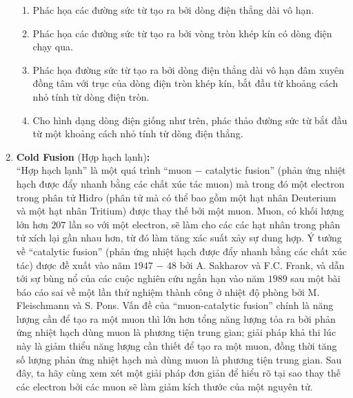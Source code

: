 \begin{vd}
\begin{enumerate}[{Phần }A.]
\begin{center}
\end{center}
 \begin{enumerate}[1)]
     \item Phác họa các đường sức từ tạo ra bởi dòng điện thẳng dài vô hạn.
     \item Phác họa các đường sức từ tạo ra bởi vòng tròn khép kín có dòng điện chạy qua.
     \item Phác họa đường sức từ tạo ra bởi dòng điện thẳng dài vô hạn đâm xuyên đồng tâm với trục của dòng điện tròn khép kín, bắt đầu từ khoảng cách nhỏ tính từ dòng điện tròn.
     \item Cho hình dạng dòng điện giống như trên, phác thảo đường sức từ bắt đầu từ một khoảng cách nhỏ tính từ dòng điện thẳng.
 \end{enumerate}   
    \item \textbf{Cold Fusion} (Hợp hạch lạnh)\textbf{:}\\
``Hợp hạch lạnh'' là một quá trình ``muon $-$ catalytic fusion'' (phản ứng nhiệt hạch được đẩy nhanh bằng các chất xúc tác muon) mà trong đó một electron trong phân tử Hidro (phân tử mà có thể bao gồm một hạt nhân Deuterium và một hạt nhân Tritium) được thay thế bởi một muon. Muon, có khối lượng lớn hơn $207$ lần so với một electron, sẽ làm cho các  các hạt nhân trong phân tử xích lại gần nhau hơn, từ đó làm tăng xác suất xảy sự dung hợp. Ý tưởng về ``catalytic fusion'' (phản ứng nhiệt hạch được đẩy nhanh bằng các chất xúc tác) được đề xuất vào năm $1947$ $-$ $48$ bởi  A. Sakharov và F.C. Frank, và dẫn tới sự bùng nổ của các cuộc nghiên cứu ngắn hạn vào năm $1989$ sau một bài báo cáo sai về một lần thử nghiệm thành công ở nhiệt độ phòng bởi M. Fleischmann và S. Pons. Vấn đề của ``muon-catalytic fusion'' chính là năng lượng cần để tạo ra một muon thì lớn hơn tổng năng lượng tỏa ra bởi phản ứng nhiệt hạch dùng muon là phương tiện trung gian; giải pháp khả thi lúc này là giảm thiểu năng lượng cần thiết để tạo ra một muon, đồng thời tăng số lượng phản ứng nhiệt hạch mà dùng muon là phương tiện trung gian. Sau đây, ta hãy cùng xem xét một giải pháp đơn giản để hiểu rõ tại sao thay thế các electron bởi các muon sẽ làm giảm kích thước của một nguyên tử.

\end{enumerate}
\end{vd}
